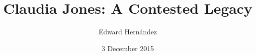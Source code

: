 \documentclass[man,12pt,natbib]{apa6}
\begin{document}
\title{Claudia Jones: A Contested Legacy}
\author{Edward Hern\'{a}ndez}
\date{3 December 2015}
\maketitle



\nocite{Azikiwe13}
\nocite{Davies08}
\nocite{Davies11}
\nocite{Davis15}
\nocite{deHaan13}
\nocite{Hinds08}
\nocite{Howard13}
\nocite{Johnson08}
\nocite{Johnson84}
\nocite{Jones49a}
\nocite{Jones49b}
\nocite{Keith13}
\nocite{Lalkar}
\nocite{Lynn14}
\nocite{Mahamdallie04}
\nocite{McDuffie11}
\nocite{McKittrick08}
\nocite{OBrien14}
\nocite{Olende14}
\nocite{Shabazz09}
\nocite{Sherwood00}
\nocite{Taylor08}
\nocite{Thomson09}
\nocite{Washington03}
\nocite{Weigand01}

\clearpage

\end{document}
